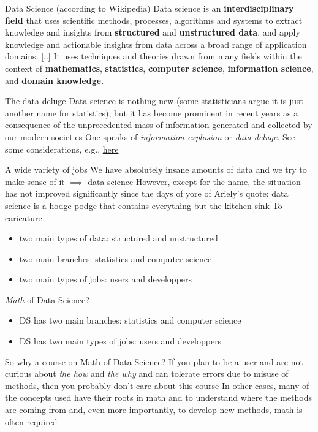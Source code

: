 \documentclass[aspectratio=169]{beamer}\usepackage[]{graphicx}\usepackage[]{xcolor}
\begin{document}
\begin{frame}{Data Science (according to Wikipedia)}
Data science is an \textbf{interdisciplinary field} that uses scientific methods, processes, algorithms and systems to extract knowledge and insights from \textbf{structured} and \textbf{unstructured data}, and apply knowledge and actionable insights from data across a broad range of application domains.
\vfill
[..] It uses techniques and theories drawn from many fields within the context of \textbf{mathematics}, \textbf{statistics}, \textbf{computer science}, \textbf{information science}, and \textbf{domain knowledge}.
\end{frame}

\begin{frame}{The data deluge}
\bbullet Data science is nothing new (some statisticians argue it is just another name for statistics), but it has become prominent in recent years as a consequence of the unprecedented mass of information generated and collected by our modern societies
\vfill
\bbullet One speaks of \textit{information explosion} or \textit{data deluge}. See some considerations, e.g., \href{https://bernardmarr.com/how-much-data-is-there-in-the-world/}{here}
\end{frame}

\begin{frame}{A wide variety of jobs}
We have absolutely insane amounts of data and we try to make sense of it
\vfill
$\implies$ data science
\vfill
However, except for the name, the situation has not improved significantly since the days of yore of Ariely's quote: data science is a hodge-podge that contains everything but the kitchen sink
\vfill
To caricature
\begin{itemize}
\item two main types of data: structured and unstructured
\item two main branches: statistics and computer science
\item two main types of jobs: users and developpers
\end{itemize}
\end{frame}

\begin{frame}{\textit{Math} of Data Science?}
\begin{itemize}
\item DS has two main branches: statistics and computer science
\item DS has two main types of jobs: users and developpers
\end{itemize}
\vfill
So why a course on Math of Data Science?
\vfill
If you plan to be a user and are not curious about \textit{the how} and \textit{the why} and can tolerate errors due to misuse of methods, then you probably don't care about this course
\vfill
In other cases, many of the concepts used have their roots in math and to understand where the methods are coming from and, even more importantly, to develop new methods, math is often required
\end{frame}
\end{document}
